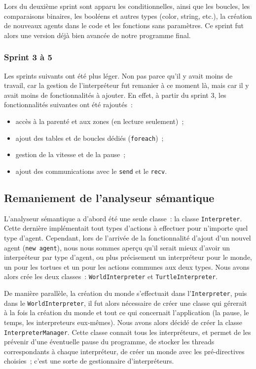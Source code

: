 Lors du deuxième sprint sont apparu les conditionnelles, ainsi que les boucles, les comparaisons binaires, les booléens et autres types (color, string, etc.), la création de nouveaux agents dans le code et les fonctions sans paramètres. Ce sprint fut alors une version déjà bien avancée de notre programme final.


\subsubsection{Sprint 3 à 5}
Les sprints suivants ont été plus léger. Non pas parce qu'il y avait moins de travail, car la gestion de l'interpréteur fut remanier à ce moment là, mais car il y avait moins de fonctionnalités à ajouter. En effet, à partir du sprint 3, les fonctionnalités suivantes ont été rajoutés~:
\begin{itemize}
\item accès à la parenté et aux zones (en lecture seulement)~;
\item ajout des tables et de boucles dédiés (\verb|foreach|)~;
\item gestion de la vitesse et de la pause~;
\item ajout des communications avec le \verb|send| et le \verb|recv|.
\end{itemize}


\subsection{Remaniement de l'analyseur sémantique}
\label{remaniementInterpreter}

L'analyseur sémantique a d'abord été une seule classe~: la classe \verb|Interpreter|.
Cette dernière implémentait tout types d'actions à effectuer pour n'importe quel type d'agent.
Cependant, lors de l'arrivée de la fonctionnalité d'ajout d'un nouvel agent (\verb|new agent|), nous nous sommes aperçu qu'il serait mieux d'avoir un interpréteur par type d'agent, ou plus précisement un interpréteur pour le monde, un pour les tortues et un pour les actions communes aux deux types.
Nous avons alors crée les deux classes~: \verb|WorldInterpreter| et \verb|TurtleInterpreter|.

De manière parallèle, la création du monde s'effectuait dans l'\verb|Interpreter|, puis dans le \verb|WorldInterpreter|, il fut alors nécessaire de créer une classe qui gérerait à la fois la création du monde et tout ce qui concernait l'application (la pause, le temps, les interpreteurs eux-mêmes). Nous avons alors décidé de créer la classe \verb|InterpreterManager|.
Cette classe connait tous les interpréteurs, et permet de les prévenir d'une éventuelle pause du programme, de stocker les threads correspondants à chaque interpréteur, de créer un monde avec les pré-directives choisies~; c'est une sorte de gestionnaire d'interpréteurs.
